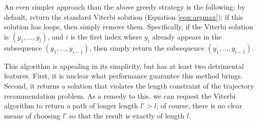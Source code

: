
An even simpler approach than the above greedy strategy is the following:
by default, return the standard Viterbi solution (Equation \ref{eqn:argmax});
if this solution has loops, then simply remove them.
Specifically, if the Viterbi solution is $( y_1, \ldots, y_l )$,
and $i$ is the first index where $y_i$ already appears in the subsequence $( y_1, \ldots, y_{i-1} )$,
then simply return the subsequence $( y_1, \ldots, y_{i-1} )$.

This algorithm is appealing in its simplicity,
but has at least two detrimental features.
First, it is unclear what performance guarantee this method brings.
Second, it returns a solution that violates the length constraint of the trajectory recommendation problem.
As a remedy to this, we can request the Viterbi algorithm to return a path of longer length $l' > l$;
of course, there is no clear means of choosing $l'$ so that the result is exactly of length $l$.


